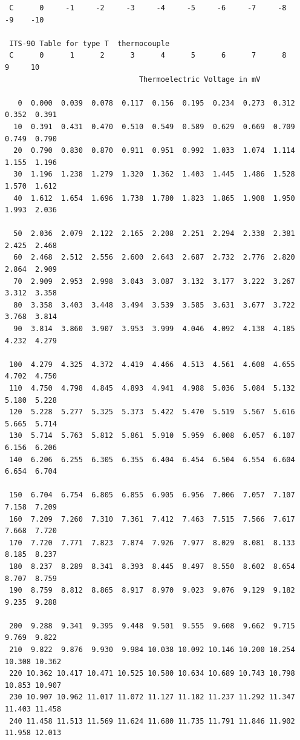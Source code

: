 \documentclass[paper=a4, fontsize=11pt, abstract=on]{scrartcl}
\numberwithin{equation}{section}		%
\numberwithin{figure}{section}			%
\numberwithin{table}{section}				%
\begin{document}
\begin{lstlisting}
 C      0     -1     -2     -3     -4     -5     -6     -7     -8     -9    -10 
 
 ITS-90 Table for type T  thermocouple
 C      0      1      2      3      4      5      6      7      8      9     10   
                               Thermoelectric Voltage in mV
 
   0  0.000  0.039  0.078  0.117  0.156  0.195  0.234  0.273  0.312  0.352  0.391  
  10  0.391  0.431  0.470  0.510  0.549  0.589  0.629  0.669  0.709  0.749  0.790  
  20  0.790  0.830  0.870  0.911  0.951  0.992  1.033  1.074  1.114  1.155  1.196  
  30  1.196  1.238  1.279  1.320  1.362  1.403  1.445  1.486  1.528  1.570  1.612  
  40  1.612  1.654  1.696  1.738  1.780  1.823  1.865  1.908  1.950  1.993  2.036  
 
  50  2.036  2.079  2.122  2.165  2.208  2.251  2.294  2.338  2.381  2.425  2.468  
  60  2.468  2.512  2.556  2.600  2.643  2.687  2.732  2.776  2.820  2.864  2.909  
  70  2.909  2.953  2.998  3.043  3.087  3.132  3.177  3.222  3.267  3.312  3.358  
  80  3.358  3.403  3.448  3.494  3.539  3.585  3.631  3.677  3.722  3.768  3.814  
  90  3.814  3.860  3.907  3.953  3.999  4.046  4.092  4.138  4.185  4.232  4.279  
 
 100  4.279  4.325  4.372  4.419  4.466  4.513  4.561  4.608  4.655  4.702  4.750  
 110  4.750  4.798  4.845  4.893  4.941  4.988  5.036  5.084  5.132  5.180  5.228  
 120  5.228  5.277  5.325  5.373  5.422  5.470  5.519  5.567  5.616  5.665  5.714  
 130  5.714  5.763  5.812  5.861  5.910  5.959  6.008  6.057  6.107  6.156  6.206  
 140  6.206  6.255  6.305  6.355  6.404  6.454  6.504  6.554  6.604  6.654  6.704  
 
 150  6.704  6.754  6.805  6.855  6.905  6.956  7.006  7.057  7.107  7.158  7.209  
 160  7.209  7.260  7.310  7.361  7.412  7.463  7.515  7.566  7.617  7.668  7.720  
 170  7.720  7.771  7.823  7.874  7.926  7.977  8.029  8.081  8.133  8.185  8.237  
 180  8.237  8.289  8.341  8.393  8.445  8.497  8.550  8.602  8.654  8.707  8.759  
 190  8.759  8.812  8.865  8.917  8.970  9.023  9.076  9.129  9.182  9.235  9.288  
 
 200  9.288  9.341  9.395  9.448  9.501  9.555  9.608  9.662  9.715  9.769  9.822  
 210  9.822  9.876  9.930  9.984 10.038 10.092 10.146 10.200 10.254 10.308 10.362  
 220 10.362 10.417 10.471 10.525 10.580 10.634 10.689 10.743 10.798 10.853 10.907  
 230 10.907 10.962 11.017 11.072 11.127 11.182 11.237 11.292 11.347 11.403 11.458  
 240 11.458 11.513 11.569 11.624 11.680 11.735 11.791 11.846 11.902 11.958 12.013  
 

\end{lstlisting}
\end{document}
